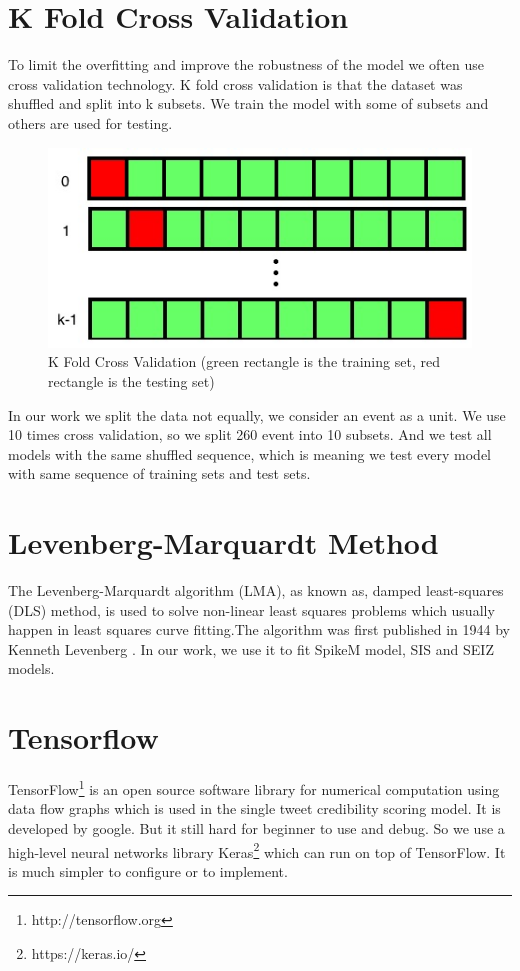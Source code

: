 \newpage
\section{K Fold Cross Validation } 
To limit the overfitting and improve the robustness of the model we often use cross validation technology. K fold cross validation is that the dataset was shuffled and split into k subsets. We train the model with some of subsets and others are used for testing.
\begin{figure}[!h]
\centering
\includegraphics[width=0.55\columnwidth]{images/CrossV.png}
\caption{K Fold Cross Validation (green rectangle is the training set, red rectangle is the testing set)  }
\label{fig:GRU}
\end{figure}

In our work we split the data not equally, we consider an event as a unit.  We use 10 times cross validation, so we split 260 event into 10 subsets. And we test all models with the same shuffled sequence, which is meaning we test every model with same sequence of training sets and test sets.

\section{Levenberg-Marquardt Method} %
\label{sec:LM}
The Levenberg-Marquardt algorithm (LMA), as known as, damped least-squares (DLS) method, is used to solve non-linear least squares problems which usually happen in least squares curve fitting.The algorithm was first published in 1944 by Kenneth Levenberg \cite{levenberg1944method}. In our work, we use it to fit SpikeM model, SIS and SEIZ models.

 
\section{Tensorflow } %
TensorFlow\footnote{http://tensorflow.org} is an open source software library for numerical computation using data flow graphs which is used in the single tweet credibility scoring model. It is developed by google. But it still hard for beginner to use and  debug. So we use a high-level neural networks library Keras\footnote{https://keras.io/} which can run on top of TensorFlow. It is much simpler to configure or to implement. 

